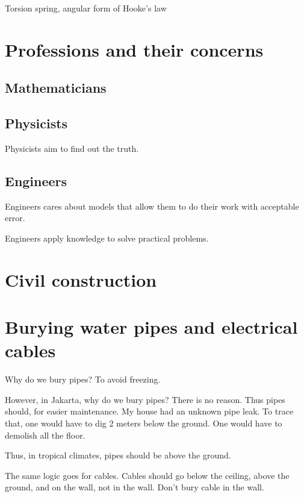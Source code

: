 Torsion spring, angular form of Hooke's law


\section{Professions and their concerns}

\subsection{Mathematicians}

\subsection{Physicists}

Physicists aim to find out the truth.

\subsection{Engineers}

Engineers cares about models that allow them to do their work with acceptable error.

Engineers apply knowledge to solve practical problems.

\section{Civil construction}

\section{Burying water pipes and electrical cables}

Why do we bury pipes?
To avoid freezing.

However, in Jakarta, why do we bury pipes?
There is no reason.
Thus pipes should, for easier maintenance.
My house had an unknown pipe leak.
To trace that, one would have to dig 2 meters below the ground.
One would have to demolish all the floor.

Thus, in tropical climates, pipes should be above the ground.

The same logic goes for cables.
Cables should go below the ceiling, above the ground, and on the wall, not in the wall.
Don't bury cable in the wall.

